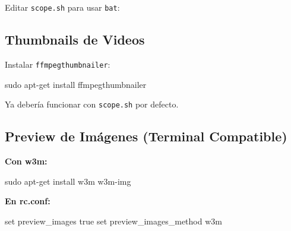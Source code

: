 \documentclass[
  doc,
  floatsintext,
  longtable,
  a4paper,
  nolmodern,
  notxfonts,
  notimes,
  12pt,
  colorlinks=true,linkcolor=blue,citecolor=blue,urlcolor=blue]{apa7}
\newenvironment{Shaded}{\begin{snugshade}}{\end{snugshade}}
\newcommand{\AttributeTok}[1]{\textcolor[rgb]{0.40,0.45,0.13}{#1}}
\newcommand{\BuiltInTok}[1]{\textcolor[rgb]{0.00,0.23,0.31}{#1}}
\newcommand{\ControlFlowTok}[1]{\textcolor[rgb]{0.00,0.23,0.31}{\textbf{#1}}}
\newcommand{\ExtensionTok}[1]{\textcolor[rgb]{0.00,0.23,0.31}{#1}}
\newcommand{\FunctionTok}[1]{\textcolor[rgb]{0.28,0.35,0.67}{#1}}
\newcommand{\KeywordTok}[1]{\textcolor[rgb]{0.00,0.23,0.31}{\textbf{#1}}}
\newcommand{\NormalTok}[1]{\textcolor[rgb]{0.00,0.23,0.31}{#1}}
\newcommand{\OperatorTok}[1]{\textcolor[rgb]{0.37,0.37,0.37}{#1}}
\newcommand{\PreprocessorTok}[1]{\textcolor[rgb]{0.68,0.00,0.00}{#1}}
\newcommand{\SpecialStringTok}[1]{\textcolor[rgb]{0.13,0.47,0.30}{#1}}
\newcommand{\StringTok}[1]{\textcolor[rgb]{0.13,0.47,0.30}{#1}}
\newcommand{\VariableTok}[1]{\textcolor[rgb]{0.07,0.07,0.07}{#1}}
\begin{document}
Editar \texttt{scope.sh} para usar \texttt{bat}:

\begin{Shaded}
\end{Shaded}

\subsection{Thumbnails de Videos}\label{thumbnails-de-videos}

Instalar \texttt{ffmpegthumbnailer}:

\begin{Shaded}
\begin{Highlighting}[]
\FunctionTok{sudo}\NormalTok{ apt{-}get install ffmpegthumbnailer}
\end{Highlighting}
\end{Shaded}

Ya debería funcionar con \texttt{scope.sh} por defecto.

\subsection{Preview de Imágenes (Terminal
Compatible)}\label{preview-de-imuxe1genes-terminal-compatible}

\textbf{Con w3m:}

\begin{Shaded}
\begin{Highlighting}[]
\FunctionTok{sudo}\NormalTok{ apt{-}get install w3m w3m{-}img}
\end{Highlighting}
\end{Shaded}

\textbf{En rc.conf:}

\begin{Shaded}
\begin{Highlighting}[]
\BuiltInTok{set}\NormalTok{ preview\_images true}
\BuiltInTok{set}\NormalTok{ preview\_images\_method w3m}
\end{Highlighting}
\end{Shaded}
\end{document}

